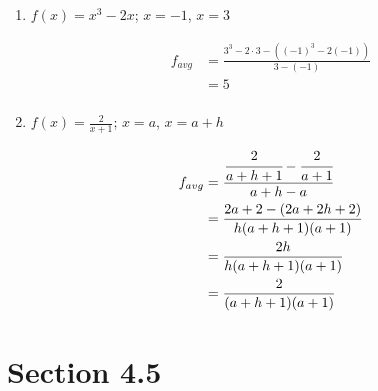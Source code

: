 \documentclass{exam}
\begin{document}
    \begin{enumerate}
      \item $f(x) = x^3 - 2x$; $x = -1$, $x = 3$
        \begin{solution}
          \begin{align*}
            f_{avg} &= \frac{3^3 - 2 \cdot 3 - \left( (-1)^3 - 2(-1) \right)}{3 - (-1)} \\
                    &= 5 \\
          \end{align*}
        \end{solution}

      \item $f(x) = \frac{2}{x + 1}$; $x = a$, $x = a + h$
        \begin{solution}
          \begin{align*}
            f_{avg} &= \cfrac{\cfrac{2}{a + h + 1} - \cfrac{2}{a + 1}}{a + h - a} \\
                    &= \frac{2a + 2 - (2a + 2h + 2)}{h(a + h + 1)(a + 1)} \\
                    &= \frac{2h}{h(a + h + 1)(a + 1)} \\
                    &= \frac{2}{(a + h + 1)(a + 1)} \\
          \end{align*}
        \end{solution}

    \end{enumerate}

  \ifprintanswers
    \section{Section 4.5}
\end{document}

